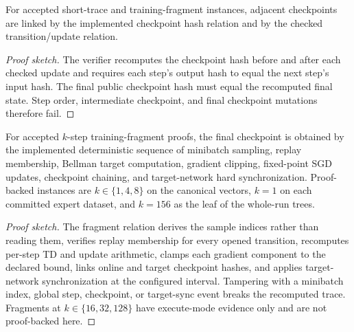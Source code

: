 \begin{theorem}
\label{thm:checkpoint-chain}
For accepted short-trace and training-fragment instances, adjacent checkpoints
are linked by the implemented checkpoint hash relation and by the checked
transition/update relation.
\end{theorem}
\begin{proof}[Proof sketch]
The verifier recomputes the checkpoint hash before and after each checked
update and requires each step's output hash to equal the next step's input hash.
The final public checkpoint hash must equal the recomputed final state.  Step
order, intermediate checkpoint, and final checkpoint mutations therefore fail.
\end{proof}

\begin{theorem}
\label{thm:training-fragment}
For accepted $k$-step training-fragment proofs, the final checkpoint is
obtained by the implemented deterministic sequence of minibatch sampling,
replay membership, Bellman target computation, gradient clipping,
fixed-point SGD updates, checkpoint chaining, and target-network hard
synchronization. Proof-backed instances are $k\in\{1,4,8\}$ on the canonical
vectors, $k=1$ on each committed expert dataset, and $k=156$ as the leaf of the
whole-run trees.
\end{theorem}
\begin{proof}[Proof sketch]
The fragment relation derives the sample indices rather than reading them,
verifies replay membership for every opened transition, recomputes per-step
TD and update arithmetic, clamps each gradient component to the declared
bound, links online and target checkpoint hashes, and applies target-network
synchronization at the configured interval.  Tampering with a minibatch index,
global step, checkpoint, or target-sync event breaks the recomputed trace.
Fragments at $k\in\{16,32,128\}$ have execute-mode evidence only and are not
proof-backed here.
\end{proof}

